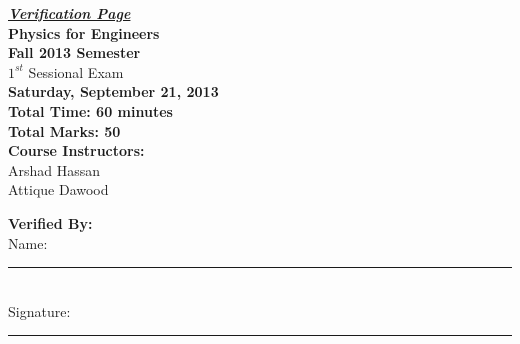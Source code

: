 \documentclass[12pt,a4paper]{article}
\begin{document}
\begin{center}
{\Huge \underline{\textbf{\textit{Verification Page}}}}\\[1.75cm]
{\LARGE \textbf{Physics for Engineers}}\\[0.15cm]
{\normalsize \textbf{Fall 2013 Semester}}\\[0.15cm]
{\Large {$1^{st}$ Sessional Exam}}\\[0.15cm]
{\normalsize \textbf{Saturday, September 21, 2013}}\\[0.45cm]
{\Large \textbf{Total Time: 60 minutes}}\\[0.15cm]
{\Large \textbf{Total Marks: 50}}\\[0.35cm]
\textbf{Course Instructors:}\\
Arshad Hassan\\
Attique Dawood\\[0.5cm]
\end{center}
\textbf{Verified By:}\\[0.55cm]
Name: \rule{5.65cm}{0.2mm}\\[0.55cm]
Signature: \rule{5cm}{0.2mm}\\[0.55cm]
\end{document}
